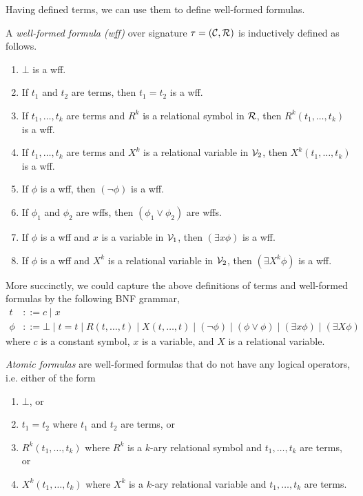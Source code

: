 \documentclass[11pt,twoside=off,numbers=noenddot]{scrbook}
\begin{document}
Having defined terms, we can use them to define well-formed formulas.

\begin{definition}
  A \emph{well-formed formula (wff)} over signature $\tau = (\mathcal{C}, \mathcal{R})$ is inductively defined as follows.
  \begin{enumerate}
    \item $\bot$ is a wff.
    \item If $t_1$ and $t_2$ are terms, then $t_1 = t_2$ is a wff.
    \item If $t_1, \dots, t_k$ are terms and $R^k$ is a relational symbol in $\mathcal{R}$, then $R^k(t_1, \dots, t_k)$ is a wff.
    \item If $t_1, \dots, t_k$ are terms and $X^k$ is a relational variable in $\mathcal{V}_2$, then $X^k(t_1, \dots, t_k)$ is a wff.
    \item If $\phi$ is a wff, then $(\neg \phi)$ is a wff.
    \item If $\phi_1$ and $\phi_2$ are wffs, then $(\phi_1 \vee \phi_2)$ are wffs.
    \item If $\phi$ is a wff and $x$ is a variable in $\mathcal{V}_1$, then $(\exists x \phi)$ is a wff.
    \item If $\phi$ is a wff and $X^k$ is a relational variable in $\mathcal{V}_2$, then $(\exists X^k \phi)$ is a wff.
  \end{enumerate}
\end{definition}

More succinctly, we could capture the above definitions of terms and well-formed formulas by the following BNF grammar,
\begin{align*}
  t & ::= c \mid x \\
  \phi & ::= \bot \mid t = t \mid R(t, \dots, t) \mid X(t, \dots, t) \mid (\neg \phi) \mid (\phi \vee \phi) \mid (\exists x \phi) \mid (\exists X \phi)
\end{align*}
where $c$ is a constant symbol, $x$ is a variable, and $X$ is a relational variable.

\emph{Atomic formulas} are well-formed formulas that do not have any logical operators, i.e. either of the form
\begin{enumerate}
  \item $\bot$, or
  \item $t_1 = t_2$ where $t_1$ and $t_2$ are terms, or
  \item $R^k(t_1, \dots, t_k)$ where $R^k$ is a $k$-ary relational symbol and $t_1, \dots, t_k$ are terms, or
  \item $X^k(t_1, \dots, t_k)$ where $X^k$ is a $k$-ary relational variable and $t_1, \dots, t_k$ are terms.
\end{enumerate}
\end{document}
